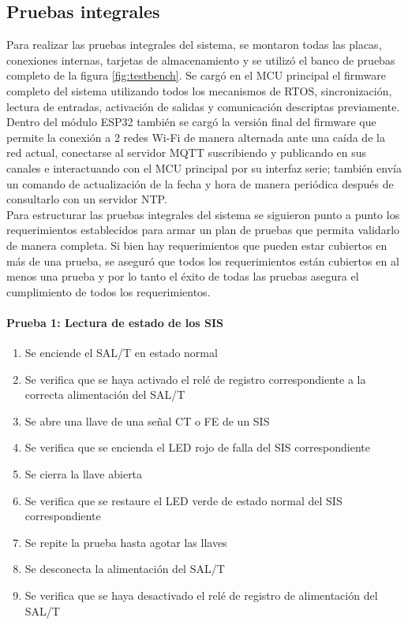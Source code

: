 \subsection{Pruebas integrales}

Para realizar las pruebas integrales del sistema, se montaron todas las placas, conexiones internas, tarjetas de almacenamiento y se utilizó el banco de pruebas completo de la figura \ref{fig:testbench}. Se cargó en el MCU principal el firmware completo del sistema utilizando todos los mecanismos de RTOS, sincronización, lectura de entradas, activación de salidas y comunicación descriptas previamente. Dentro del módulo ESP32 también se cargó la versión final del firmware que permite la conexión a 2 redes Wi-Fi de manera alternada ante una caída de la red actual, conectarse al servidor MQTT suscribiendo y publicando en sus canales e interactuando con el MCU principal por su interfaz serie; también envía un comando de actualización de la fecha y hora de manera periódica después de consultarlo con un servidor NTP. \\

Para estructurar las pruebas integrales del sistema se siguieron punto a punto los requerimientos establecidos para armar un plan de pruebas que permita validarlo de manera completa. Si bien hay requerimientos que pueden estar cubiertos en más de una prueba, se aseguró que todos los requerimientos están cubiertos en al menos una prueba y por lo tanto el éxito de todas las pruebas asegura el cumplimiento de todos los requerimientos. \\ 

\paragraph{Prueba 1: Lectura de estado de los SIS}
\begin{enumerate}
\item	Se enciende el SAL/T en estado normal
\item	Se verifica que se haya activado el relé de registro correspondiente a la correcta alimentación del SAL/T 
\item	Se abre una llave de una señal CT o FE de un SIS
\item	Se verifica que se encienda el LED rojo de falla del SIS correspondiente
\item	Se cierra la llave abierta
\item	Se verifica que se restaure el LED verde de estado normal del SIS correspondiente
\item	Se repite la prueba hasta agotar las llaves
\item	Se desconecta la alimentación del SAL/T
\item	Se verifica que se haya desactivado el relé de registro de alimentación del SAL/T 
\end{enumerate}

